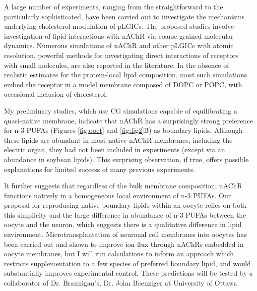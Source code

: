 
A large number of experiments, ranging from the straightforward to the particularly sophisticated, have been carried out to investigate the mechanisms underlying cholesterol modulation of pLGICs. The proposed studies involve investigation of lipid interactions with nAChR via coarse grained molecular dynamics. Numerous simulations of nAChR and other pLGICs with atomic resolution, powerful methods for investigating direct interactions of receptors with small molecules, are also reported in the literature. In the absence of realistic estimates for the protein-local lipid composition, most such simulations embed the receptor in a model membrane composed of DOPC or POPC, with occasional inclusion of cholesterol.

My preliminary studies, which use CG simulations capable of equilibrating a quasi-native membrane, indicate that nAChR has a surprisingly strong preference for n-3 PUFAs (Figures \ref{fig:ooct} and \ref{fig:fig2}B) as boundary lipids. Although these lipids are abundant in most native nAChR membranes, including the electric organ, they had not been included in experiments (except via an abundance in soybean lipids). This surprising observation, if true, offers possible explanations for limited success of many previous experiments.

It further suggests that regardless of the bulk membrane composition, nAChR functions natively in a homogeneous local environment of n-3 PUFAs. Our proposal for reproducing native boundary lipids within an oocyte relies on both this simplicity and the large difference in abundance of n-3 PUFAs between the oocyte and the neuron, which suggests there is a qualitative difference in lipid environment. Microtransplantation of neuronal cell membranes into oocytes \cite{Conti2013} has been carried out and shown to improve ion flux through nAChRs embedded in oocyte membranes, but I will run calculations to inform an approach which restricts supplementation to a few species of preferred boundary lipid, and would substantially improves experimental control. These predictions will be tested by a collaborator of Dr. Brannigan’s, Dr. John Baenziger at University of Ottawa.


